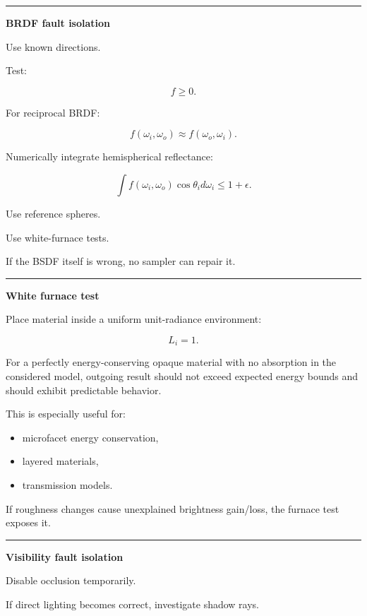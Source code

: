 \begin{center}\rule{0.5\linewidth}{0.5pt}\end{center}

\textbf{BRDF fault isolation}

Use known directions.

Test:

\[
f\ge0.
\]

For reciprocal BRDF:

\[
f(\omega_i,\omega_o)
\approx
f(\omega_o,\omega_i).
\]

Numerically integrate hemispherical reflectance:

\[
\int
f(\omega_i,\omega_o)
\cos\theta_i
d\omega_i
\le1+\epsilon.
\]

Use reference spheres.

Use white-furnace tests.

If the BSDF itself is wrong, no sampler can repair it.

\begin{center}\rule{0.5\linewidth}{0.5pt}\end{center}

\textbf{White furnace test}

Place material inside a uniform unit-radiance environment:

\[
L_i=1.
\]

For a perfectly energy-conserving opaque material with no absorption in the considered model, outgoing result should not exceed expected energy bounds and should exhibit predictable behavior.

This is especially useful for:

\begin{itemize}
\tightlist
\item
  microfacet energy conservation,
\item
  layered materials,
\item
  transmission models.
\end{itemize}

If roughness changes cause unexplained brightness gain/loss, the furnace test exposes it.

\begin{center}\rule{0.5\linewidth}{0.5pt}\end{center}

\textbf{Visibility fault isolation}

Disable occlusion temporarily.

If direct lighting becomes correct, investigate shadow rays.

